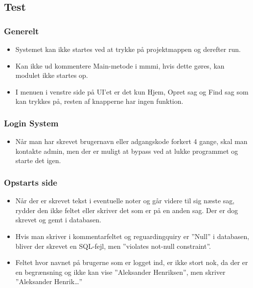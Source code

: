 \subsection{Test}

\subsubsection{Generelt}
\begin{itemize}
\item Systemet kan ikke startes ved at trykke på projektmappen og derefter run.
\item Kan ikke ud kommentere Main-metode i mmmi, hvis dette gøres, kan modulet ikke startes op.
\item I menuen i venstre side på UI’et er det kun Hjem, Opret sag og Find sag som kan trykkes på, resten af knapperne har ingen funktion.
\end{itemize}
\subsubsection{Login System}
\begin{itemize}
\item Når man har skrevet brugernavn eller adgangskode forkert 4 gange, skal man kontakte admin, men der er muligt at bypass ved at lukke programmet og starte det igen.
\end{itemize}
\subsubsection{Opstarts side}
\begin{itemize}
\item Når der er skrevet tekst i eventuelle noter og går videre til sig næste sag, rydder den ikke feltet eller skriver det som er på en anden sag. Der er dog skrevet og gemt i databasen.
\item Hvis man skriver i kommentarfeltet og reguardingquiry er ”Null” i databasen, bliver der skrevet en SQL-fejl, men ”violates not-null constraint”. 
\item Feltet hvor navnet på brugerne som er logget ind, er ikke stort nok, da der er en begrænsning og ikke kan vise ”Aleksander Henriksen”, men skriver ”Aleksander Henrik…”
\end{itemize}
